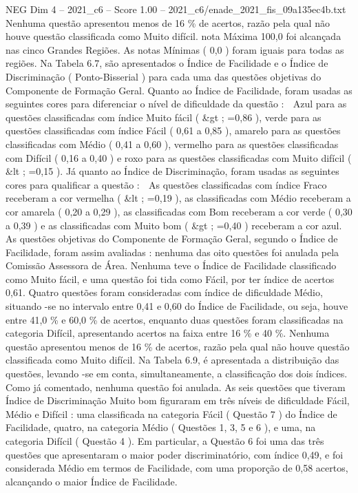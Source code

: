 \begin{textsample}{NEG Dim 4 – 2021\_c6 – Score 1.00 – 2021\_c6/enade\_2021\_fis\_09a135ec4b.txt}
Nenhuma questão apresentou menos de 16 \% de acertos, razão pela qual não houve questão classificada como Muito difícil. nota Máxima 100,0 foi alcançada nas cinco Grandes Regiões.
As notas Mínimas ( 0,0 ) foram iguais para todas as regiões.
Na Tabela 6.7, são apresentados o Índice de Facilidade e o Índice de Discriminação ( Ponto-Bisserial ) para cada uma das questões objetivas do Componente de Formação Geral.
Quanto ao Índice de Facilidade, foram usadas as seguintes cores para diferenciar o nível de dificuldade da questão :  Azul para as questões classificadas com índice Muito fácil ( \&gt ; =0,86 ), verde para as questões classificadas com índice Fácil ( 0,61 a 0,85 ), amarelo para as questões classificadas com Médio ( 0,41 a 0,60 ), vermelho para as questões classificadas com Difícil ( 0,16 a 0,40 ) e roxo para as questões classificadas com Muito difícil ( \&lt ; =0,15 ).
Já quanto ao Índice de Discriminação, foram usadas as seguintes cores para qualificar a questão :  As questões classificadas com índice Fraco receberam a cor vermelha ( \&lt ; =0,19 ), as classificadas com Médio receberam a cor amarela ( 0,20 a 0,29 ), as classificadas com Bom receberam a cor verde ( 0,30 a 0,39 ) e as classificadas com Muito bom ( \&gt ; =0,40 ) receberam a cor azul.
As questões objetivas do Componente de Formação Geral, segundo o Índice de Facilidade, foram assim avaliadas : nenhuma das oito questões foi anulada pela Comissão Assessora de Área.
Nenhuma teve o Índice de Facilidade classificado como Muito fácil, e uma questão foi tida como Fácil, por ter índice de acertos 0,61.
Quatro questões foram consideradas com índice de dificuldade Médio, situando -se no intervalo entre 0,41 e 0,60 do Índice de Facilidade, ou seja, houve entre 41,0 \% e 60,0 \% de acertos, enquanto duas questões foram classificadas na categoria Difícil, apresentando acertos na faixa entre 16 \% e 40 \%.
Nenhuma questão apresentou menos de 16 \% de acertos, razão pela qual não houve questão classificada como Muito difícil.
Na Tabela 6.9, é apresentada a distribuição das questões, levando -se em conta, simultaneamente, a classificação dos dois índices.
Como já comentado, nenhuma questão foi anulada.
As seis questões que tiveram Índice de Discriminação Muito bom figuraram em três níveis de dificuldade Fácil, Médio e Difícil : uma classificada na categoria Fácil ( Questão 7 ) do Índice de Facilidade, quatro, na categoria Médio ( Questões 1, 3, 5 e 6 ), e uma, na categoria Difícil ( Questão 4 ).
Em particular, a Questão 6 foi uma das três questões que apresentaram o maior poder discriminatório, com índice 0,49, e foi considerada Médio em termos de Facilidade, com uma proporção de 0,58 acertos, alcançando o maior Índice de Facilidade.

\end{textsample}
